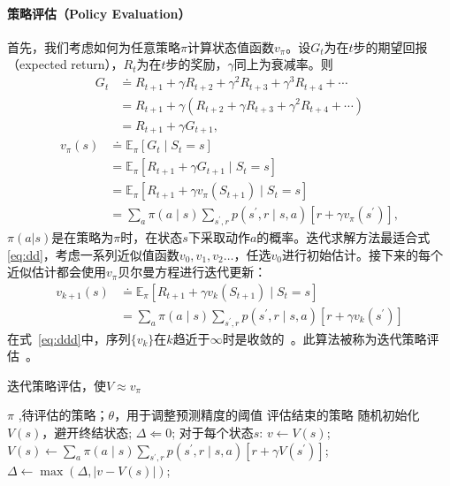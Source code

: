 \paragraph{策略评估（Policy Evaluation）}
首先，我们考虑如何为任意策略$\pi$计算状态值函数$v_{\pi}$。设$G_{t}$为在$t$步的期望回报（expected return），$R_{t}$为在$t$步的奖励，$\gamma$同上为衰减率。则
\begin{equation*}
  \begin{aligned}
  G_{t} & \doteq R_{t+1}+\gamma R_{t+2}+\gamma^{2} R_{t+3}+\gamma^{3} R_{t+4}+\cdots \\
  &=R_{t+1}+\gamma\left(R_{t+2}+\gamma R_{t+3}+\gamma^{2} R_{t+4}+\cdots\right) \\
  &=R_{t+1}+\gamma G_{t+1},
  \end{aligned}
\end{equation*}
\begin{equation}
  \begin{aligned}
  v_{\pi}(s) & \doteq \mathbb{E}_{\pi}\left[G_{t} \mid S_{t}=s\right] \\
  &=\mathbb{E}_{\pi}\left[R_{t+1}+\gamma G_{t+1} \mid S_{t}=s\right] \\
  &=\mathbb{E}_{\pi}\left[R_{t+1}+\gamma v_{\pi}\left(S_{t+1}\right) \mid S_{t}=s\right] \\
  &=\sum_{a} \pi(a \mid s) \sum_{s^{\prime}, r} p\left(s^{\prime}, r \mid s, a\right)\left[r+\gamma v_{\pi}\left(s^{\prime}\right)\right],
  \end{aligned}
  \label{eq:dd}
\end{equation}
$\pi(a|s)$是在策略为$\pi$时，在状态$s$下采取动作$a$的概率。迭代求解方法最适合式\ref{eq:dd}，考虑一系列近似值函数$v_{0},v_{1},v_{2}\dots$，任选$v_{0}$进行初始估计。接下来的每个近似估计都会使用$v_{\pi}$贝尔曼方程\cite{dixit1990optimization}进行迭代更新：
\begin{equation}
  \begin{aligned}
  v_{k+1}(s) & \doteq \mathbb{E}_{\pi}\left[R_{t+1}+\gamma v_{k}\left(S_{t+1}\right) \mid S_{t}=s\right] \\
  &=\sum_{a} \pi(a \mid s) \sum_{s^{\prime}, r} p\left(s^{\prime}, r \mid s, a\right)\left[r+\gamma v_{k}\left(s^{\prime}\right)\right]
  \end{aligned}
  \label{eq:ddd}
\end{equation}
在式~\ref{eq:ddd}中，序列$\{v_{k}\}$在$k$趋近于$\infty$时是收敛的~\cite{kamien2013dynamic}。此算法被称为迭代策略评估~\cite{Sutton1998}。
\begin{algorithm}[H]
  \caption{迭代策略评估，使$V\approx v_{\pi} $}
  \begin{algorithmic}[1]
    \Require $\pi$ ,待评估的策略；$\theta$，用于调整预测精度的阈值
    \Ensure 评估结束的策略
    \State 随机初始化$V(s)$，避开终结状态;
    \Repeat
    \State $\Delta\Leftarrow 0$;
    \Loop 对于每个状态$s$:
    \State $v \leftarrow V(s)$;
    \State $V(s) \leftarrow \sum_{a} \pi(a \mid s) \sum_{s^{\prime}, r} p\left(s^{\prime}, r \mid s, a\right)\left[r+\gamma V\left(s^{\prime}\right)\right]$;
    \State $\Delta \leftarrow \max (\Delta,|v-V(s)|)$;
    \EndLoop
    \Until{ $\Delta \le \theta$}
  \end{algorithmic}
\end{algorithm}
